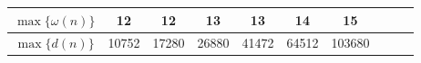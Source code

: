 \begin{table}[H]
\begin{tabular}{|c|c|c|c|c|c|c|c|c|c|}
			\hline
			$\max\{\omega(n)\}$ & 12 & 12 & 13 & 13 & 14 & 15 \\
			\hline
			$\max\{d(n)\}$ & 10752 & 17280 & 26880 & 41472 & 64512 & 103680\\
			\hline
			\end{tabular}
\begin{comment}
		\begin{tabular}{|r|r|r|r|}
			\hline
			n  & LCM(1...n)  & Pn  & Bn \\
			\hline
			2  & 2  & 2  & 2 \\
			\hline
			3  & 6  & 3  & 5 \\
			\hline
			4  & 12  & 5  & 15 \\
			\hline
			5  & 60  & 7  & 52 \\
			\hline
			6  & 60  & 11  & 203 \\
			\hline
			7  & 420  & 15  & 877 \\
			\hline
			8  & 840  & 22  & 4140 \\
			\hline
			9  & 2520  & 30  & 21147 \\
			\hline
			10  & 2520  & 42  & 115975 \\
			\hline
			11  & 27720  & 56  & 678570 \\
			\hline
			12  & 27720  & 77  & 4213597 \\
			\hline
			15  & 360360  & 176  & 1382958545 \\
			\hline
			20  & 232792560  & 627  &  \\
			\hline
			25  &   & 1958  &  \\
			\hline
			30  &   & 5604  &  \\
			\hline
			40  &   & 37338  &  \\
			\hline
			50  &   & 204226  &  \\
			\hline
			70  &   & 4087968  &  \\
			\hline
			100  &   & 190569292  &  \\
			\hline
		\end{tabular}
\end{comment}
	\end{table}